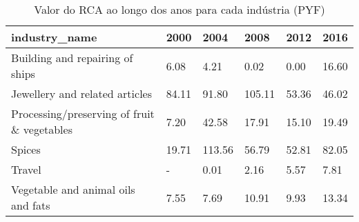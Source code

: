 \begin{table}
\centering
\caption{Valor do RCA ao longo dos anos para cada indústria (PYF)}
\begin{tabular}{p{6cm}p{1.5cm}p{1.5cm}p{1.5cm}p{1.5cm}p{1.5cm}}
\toprule
                              industry\_name &  2000 &   2004 &   2008 &  2012 &  2016 \\
\midrule
            Building and repairing of ships &  6.08 &   4.21 &   0.02 &  0.00 & 16.60 \\
             Jewellery and related articles & 84.11 &  91.80 & 105.11 & 53.36 & 46.02 \\
Processing/preserving of fruit \& vegetables &  7.20 &  42.58 &  17.91 & 15.10 & 19.49 \\
                                     Spices & 19.71 & 113.56 &  56.79 & 52.81 & 82.05 \\
                                     Travel &     - &   0.01 &   2.16 &  5.57 &  7.81 \\
         Vegetable and animal oils and fats &  7.55 &   7.69 &  10.91 &  9.93 & 13.34 \\
\bottomrule
\end{tabular}
\end{table}
